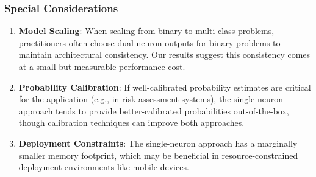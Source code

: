 \subsubsection{Special Considerations}

\begin{enumerate}
\item \textbf{Model Scaling}: When scaling from binary to multi-class problems, practitioners often choose dual-neuron outputs for binary problems to maintain architectural consistency. Our results suggest this consistency comes at a small but measurable performance cost.

\item \textbf{Probability Calibration}: If well-calibrated probability estimates are critical for the application (e.g., in risk assessment systems), the single-neuron approach tends to provide better-calibrated probabilities out-of-the-box, though calibration techniques can improve both approaches.

\item \textbf{Deployment Constraints}: The single-neuron approach has a marginally smaller memory footprint, which may be beneficial in resource-constrained deployment environments like mobile devices.
\end{enumerate}
